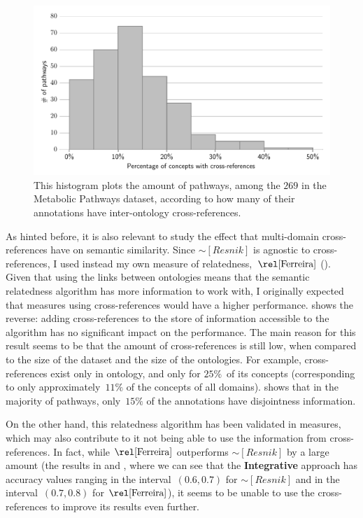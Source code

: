 \begin{figure}
    \centering
    \includegraphics[width=0.9\linewidth]{images/pathways-xref-histogram.pdf}
    \caption[The distribution of the percentage of annotations that have cross-references]{This histogram plots the amount of pathways, among the $269$ in the Metabolic Pathways dataset, according to how many of their annotations have inter-ontology cross-references.}
    \label{fig:xref-histogram}
\end{figure}

As hinted before, it is also relevant to study the effect that multi-domain cross-references have on semantic similarity. Since $\sim[Resnik]$ is agnostic to cross-references, I used instead my own measure of relatedness,~$\ferreira$ (). Given that using the links between ontologies means that the semantic relatedness algorithm has more information to work with, I originally expected that measures using cross-references would have a higher performance.  shows the reverse: adding cross-references to the store of information accessible to the algorithm has no significant impact on the performance. The main reason for this result seems to be that the amount of cross-references is still low, when compared to the size of the dataset and the size of the ontologies. For example, cross-references exist only in  ontology, and only for $25\%$~of its concepts (corresponding to only approximately~$11\%$ of the concepts of all domains).  shows that in the majority of pathways, only~$15\%$ of the annotations have disjointness information.

On the other hand, this relatedness algorithm has been validated in  measures, which may also contribute to it not being able to use the information from  cross-references. In fact, while $\ferreira$ outperforms $\sim[Resnik]$ by a large amount (\cf the results in  and , where we can see that the \textbf{Integrative} approach has accuracy values ranging in the interval~$(0.6, 0.7)$ for $\sim[Resnik]$ and in the interval~$(0.7, 0.8)$ for $\ferreira$), it seems to be unable to use the cross-references to improve its results even further.


